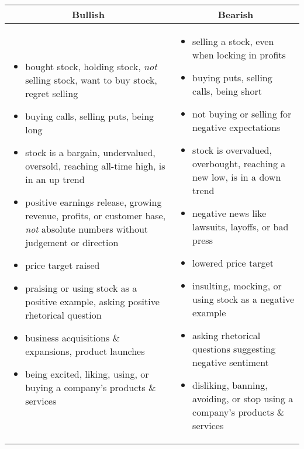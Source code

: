 \begin{table}[!ht]
\centering
\small
\begin{tabular}{p{7.5cm}p{7.5cm}}
\toprule
\multicolumn{1}{c}{\textbf{Bullish}} & \multicolumn{1}{c}{\textbf{Bearish}} \\
\midrule

\begin{itemize}[noitemsep,leftmargin=*,topsep=-12pt]
	\item bought stock, holding stock, \emph{not} selling stock, want to buy stock, regret selling
	\item buying calls, selling puts, being long
	\item stock is a bargain, undervalued, oversold, reaching all-time high, is in an up trend
	\item positive earnings release, growing revenue, profits, or customer base, \emph{not} absolute numbers without judgement or direction
	\item price target raised
	\item praising or using stock as a positive example, asking positive rhetorical question
	\item business acquisitions \& expansions, product launches
	\item being excited, liking, using, or buying a company's products \& services

\end{itemize} & \begin{itemize}[noitemsep,leftmargin=*,topsep=-12pt]
	\item selling a stock, even when locking in profits
	\item buying puts, selling calls, being short
	\item not buying or selling for negative expectations
 	\item stock is overvalued, overbought, reaching a new low, is in a down trend
 	\item negative news like lawsuits, layoffs, or bad press
 	\item lowered price target
 	\item insulting, mocking, or using stock as a negative example
 	\item asking rhetorical questions suggesting negative sentiment 
	\item disliking, banning, avoiding, or stop using a company's products \& services
\end{itemize}\\


\end{tabular}
\end{table}
